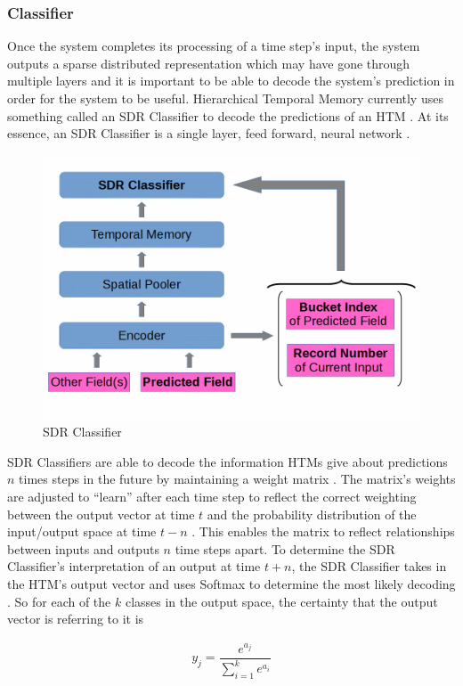 \documentclass[oneside,12pt,openany]{book}
\begin{document}
	\subsubsection{Classifier}
	
	Once the system completes its processing of a time step's input, the system outputs a sparse distributed representation which may have gone through multiple layers and it is important to be able to decode the system's prediction in order for the system to be useful. Hierarchical Temporal Memory currently uses something called an SDR Classifier to decode the predictions of an HTM \cite{Dillon}. At its essence, an SDR Classifier is a single layer, feed forward, neural network \cite{Dillon}.
	
	\begin{figure}[!ht]
		\centering
		\includegraphics[width=.6\linewidth]{images/SDRClassifier.jpg}
		\caption{SDR Classifier}
		\label{fig 3}
	\end{figure}
	
	SDR Classifiers are able to decode the information HTMs give about predictions $n$ times steps in the future by maintaining a weight matrix \cite{Dillon}. The matrix's weights are adjusted to ``learn'' after each time step to reflect the correct weighting between the output vector at time $t$ and the probability distribution of the input/output space at time $t-n$ \cite{Dillon}. This enables the matrix to reflect relationships between inputs and outputs $n$ time steps apart. To determine the SDR Classifier's interpretation of an output at time $t+n$, the SDR Classifier takes in the HTM's output vector and uses Softmax to determine the most likely decoding \cite{Dillon}. So for each of the $k$ classes in the output space, the certainty that the output vector is referring to it is 
	
	\begin{align}
	\label{eqn:htmclassact}
	y_{j} = \dfrac{e^{a_{j}}}{\sum_{i=1}^{k} e^{a_{i}}}
	\end{align}
	
\end{document}
